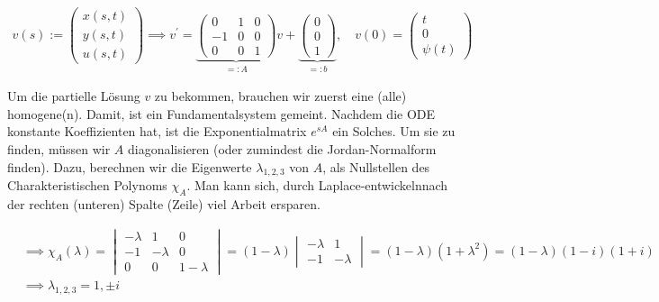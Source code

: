 \begin{solution}
\begin{align*}
    v(s)
    :=
    \begin{pmatrix}
        x(s, t) \\ y(s, t) \\ u(s, t)
    \end{pmatrix}
    \implies
    v^\prime
    =
    \underbrace
    {
        \begin{pmatrix}
             0 & 1 & 0 \\
            -1 & 0 & 0 \\
             0 & 0 & 1
        \end{pmatrix}
    }_{=: A} v
    +
    \underbrace
    {
        \begin{pmatrix}
            0 \\ 0 \\ 1
        \end{pmatrix}
    }_{=: b},
    \quad
    v(0)
    =
    \begin{pmatrix}
        t \\ 0 \\ \psi(t)
    \end{pmatrix}
\end{align*}

Um die partielle Lösung $v$ zu bekommen, brauchen wir zuerst eine (alle) homogene(n).
Damit, ist ein Fundamentalsystem gemeint.
Nachdem die ODE konstante Koeffizienten hat, ist die Exponentialmatrix $e^{sA}$ ein Solches.
Um sie zu finden, müssen wir $A$ diagonalisieren (oder zumindest die Jordan-Normalform finden).
Dazu, berechnen wir die Eigenwerte $\lambda_{1, 2, 3}$ von $A$, als Nullstellen des Charakteristischen Polynoms $\chi_A$.
Man  kann  sich,  durch  Laplace-entwickelnnach der rechten (unteren) Spalte (Zeile) viel Arbeit ersparen.

\begin{align*}
    & \implies
    \chi_A(\lambda)
    =
    \begin{vmatrix}
        -\lambda &  1       & 0 \\
        -1       & -\lambda & 0 \\
         0       &  0       & 1 - \lambda
    \end{vmatrix}
    =
    (1 - \lambda)
    \begin{vmatrix}
        -\lambda & 1 \\
        -1       & -\lambda
    \end{vmatrix}
    =
    (1 - \lambda) (1 + \lambda^2)
    =
    (1 - \lambda) (1 - i) (1 + i) \\
    & \implies
    \lambda_{1, 2, 3} = 1, \pm i
\end{align*}


\end{solution}
